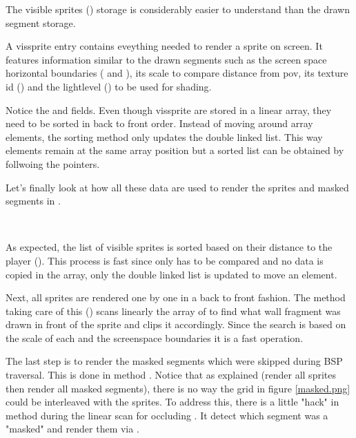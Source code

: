 \par
{}
\par
The visible sprites () storage is considerably easier to understand than the drawn segment storage.\\
\par
{}
\par
A vissprite entry contains eveything needed to render a sprite on screen. It features information similar to the drawn segments such as the screen space horizontal boundaries ( and ), its scale to compare distance from pov, its texture id () and the lightlevel () to be used for shading.\\
\par
Notice the  and  fields. Even though vissprite are stored in a linear array, they need to be sorted in back to front order. Instead of moving around array elements, the sorting method only updates the double linked list. This way elements remain at the same array position but a sorted list can be obtained by follwoing the  pointers.






Let's finally look at how all these data are used to render the sprites and masked segments in .\\
\par
{}\\
\par
As expected, the list of visible sprites is sorted based on their distance to the player (). This process is fast since only  has to be compared and no data is copied in the array, only the double linked list is updated to move an element.\\
\par
Next, all sprites are rendered one by one in a back to front fashion. The method taking care of this () scans linearly the array of  to find what wall fragment was drawn in front of the sprite and clips it accordingly. Since the search is based on the scale of each  and the screenspace  boundaries it is a fast operation.\\
\par
The last step is to render the masked segments which were skipped during BSP traversal. This is done in method . Notice that as explained (render all sprites then render all masked segments), there is no way the grid in figure  \ref{masked.png} could be interleaved with the sprites. To address this, there is a little "hack" in  method during the linear scan for occluding . It detect which segment was a "masked" and render them via .\\
\pagebreak



